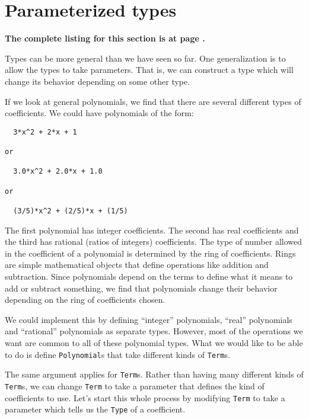 \section{Parameterized types}

{\bf The complete listing for this section is at page \pageref{ParamTypesListing}.}

Types can be more general than we have seen so far. One generalization
is to allow the types to take parameters. That is, we can construct a
type which will change its behavior depending on some other type.

If we look at general polynomials, we find that there are several
different types of coefficients. We could have polynomials of the
form:

\begin{small}
\begin{verbatim}
  3*x^2 + 2*x + 1

or 

  3.0*x^2 + 2.0*x + 1.0

or

  (3/5)*x^2 + (2/5)*x + (1/5)

\end{verbatim}
\end{small}

The first polynomial has integer coefficients. The second has 
real coefficients and the third has rational (ratios of integers)
coefficients. The type of number allowed in the coefficient of
a polynomial is determined by the ring of coefficients. Rings
are simple mathematical objects that define operations like
addition and subtraction. Since polynomials depend on the
terms to define what it means to add or subtract something,
we find that polynomials change their behavior depending on
the ring of coefficients chosen.

We could implement this by defining ``integer'' polynomials,
``real'' polynomials and ``rational'' polynomials as separate types.
However, most of the operations we want are common to all of
these polynomial types. What we would like to be able to do
is define \verb"Polynomial"s that take different kinds of \verb"Term"s.

The same argument applies for \verb"Term"s. Rather than having many 
different kinds of \verb"Term"s, we can change \verb"Term" to take a parameter
that defines the kind of coefficients to use. Let's start this 
whole process by modifying \verb"Term" to take a parameter which tells
us the \verb"Type" of a coefficient.

